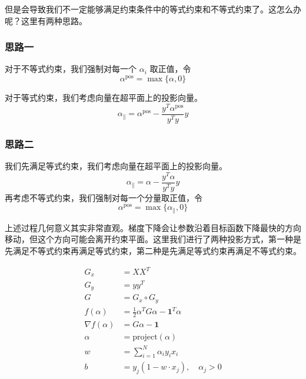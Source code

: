 但是会导致我们不一定能够满足约束条件中的等式约束和不等式约束了。这怎么办呢？这里有两种思路。

\subsubsection{思路一}

对于不等式约束，我们强制对每一个 $\alpha_i$ 取正值，令
\begin{equation}
\alpha^{\text{pos}} = \max\{\alpha, 0\}
\end{equation}

对于等式约束，我们考虑向量在超平面上的投影向量。
\begin{equation}
\alpha_{\parallel} = \alpha^{\text{pos}} - \frac{y^T\alpha^{\text{pos}}}{y^Ty}y
\end{equation}

\subsubsection{思路二}

我们先满足等式约束，我们考虑向量在超平面上的投影向量。
\begin{equation}
\alpha_{\parallel} = \alpha - \frac{y^T\alpha}{y^Ty}y
\end{equation}
再考虑不等式约束，我们强制对每一个分量取正值，令
\begin{equation}
\alpha^{\text{pos}} = \max\{\alpha_{\parallel}, 0\}
\end{equation}

上述过程几何意义其实非常直观。梯度下降会让参数沿着目标函数下降最快的方向移动，但这个方向可能会离开约束平面。这里我们进行了两种投影方式，第一种是先满足不等式约束再满足等式约束，第二种是先满足等式约束再满足不等式约束。

\begin{equation}
\boxed{
\begin{aligned}
G_x &= XX^T \\ 
G_y &= yy^T \\
G   &= G_x \circ G_y \\
f(\alpha) &= \frac{1}{2}\alpha^T G\alpha - \mathbf{1}^T\alpha \\
\nabla f(\alpha) &= G\alpha - \mathbf{1} \\
\alpha  &= \text{project}(\alpha) \\
w &= \sum_{i=1}^{N}\alpha_i y_i x_i \\
b &= y_j\left(1 - w \cdot x_j\right),\quad \alpha_j > 0
\end{aligned}
}
\end{equation}

